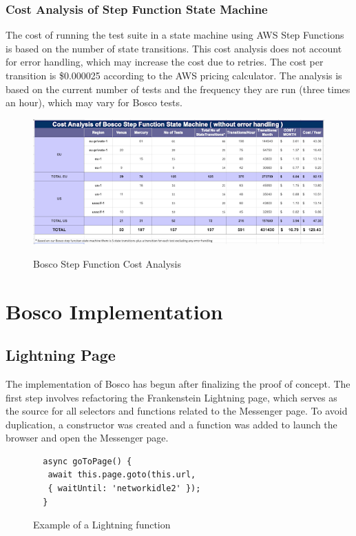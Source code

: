 \documentclass[12pt,a4paper,titlepage]{report}
\begin{document}
\subsection{Cost Analysis of Step Function State Machine}

The cost of running the test suite in a state machine using AWS Step Functions is based on the number of state transitions. This cost analysis does not account for error handling, which may increase the cost due to retries. The cost per transition is \$0.000025 according to the AWS pricing calculator. The analysis is based on the current number of tests and the frequency they are run (three times an hour), which may vary for Bosco tests.

\begin{figure}
  \centering
  {\includegraphics[width=15cm]{./diagrams/sf_cost_analysis}}
  \caption{Bosco Step Function Cost Analysis}
\end{figure}

\chapter{Bosco Implementation}

\section{Lightning Page}
The implementation of Bosco has begun after finalizing the proof of concept. The first step involves refactoring the Frankenstein Lightning page, which serves as the source for all selectors and functions related to the Messenger page. To avoid duplication, a constructor was created and a function was added to launch the browser and open the Messenger page.

\begin{figure}[H]
  \begin{tcolorbox}
    \begin{verbatim}
  async goToPage() {
   await this.page.goto(this.url, 
   { waitUntil: 'networkidle2' });
  }
\end{verbatim}
  \end{tcolorbox}
  \caption{Example of a Lightning function}
\end{figure}
\end{document}
